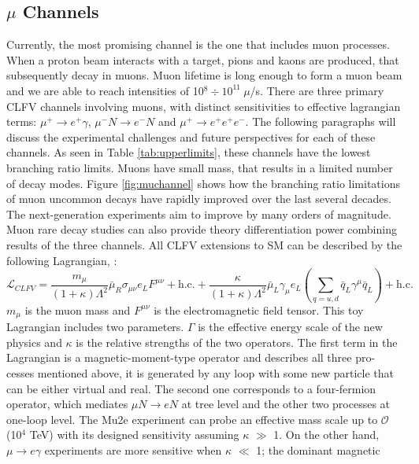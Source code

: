 \subsection{$\mu$ Channels}
Currently, the most promising channel is the one that includes muon processes. When a proton beam interacts with a target, pions and kaons are produced, that subsequently decay in muons. Muon lifetime is long enough to form a muon beam and we are able to reach intensities of 10$^8 \div 10^{11} \  \mu$/s. There are three primary CLFV channels involving muons, with distinct sensitivities to effective lagrangian terms: $\mu^+ \rightarrow e^+ \gamma$, $\mu^- N \rightarrow e^- N$ and $\mu^+ \rightarrow e^+ e^+ e^-$. The following paragraphs will discuss the experimental challenges and future perspectives for each of these channels. As seen in Table \ref{tab:upperlimits}, these channels have the lowest branching ratio limits. Muons have small mass, that results in a limited number of decay modes. Figure \ref{fig:muchannel} shows how the branching ratio limitations of muon uncommon decays have rapidly improved over the last several decades. The next-generation experiments aim to improve by many orders of magnitude. Muon rare decay studies can also provide theory differentiation power combining results of the three channels. All CLFV extensions to SM can be described by the following Lagrangian, \cite{doi:10.1146/annurev-nucl-100809-131949}:
\begin{equation}\label{LCF}
\mathscr{L}_{C L F V}=\frac{m_\mu}{(1+\kappa) \Lambda^2} \bar{\mu}_R \sigma_{\mu \nu} e_L F^{\mu \nu}+\text{h.c.}+\frac{\kappa}{(1+\kappa) \Lambda^2} \bar{\mu}_L \gamma_\mu e_L\left(\sum_{q=u, d} \bar{q}_L \gamma^\mu \bar{q}_L\right)+\text{h.c.}
\end{equation}
$m_\mu$ is the muon mass and  $F^{\mu \nu}$ is the electromagnetic field tensor. This toy Lagrangian includes two parameters.
$\Gamma$ is the effective energy scale of the new physics and $\kappa$
is the relative strengths of the two operators. The first term in the Lagrangian is a magnetic-moment-type operator and describes all three pro-
cesses mentioned above, it is generated by any loop with some new particle that can be either virtual and real.
The second one corresponds to a four-fermion operator, which mediates $\mu N \rightarrow eN$ at tree level and the other two processes at one-loop level.
The Mu2e experiment can probe an effective mass scale up to $\mathcal{O}$(10$^4$ TeV) with its designed sensitivity assuming $\kappa$ $\gg$ 1.
On the other hand, $\mu \rightarrow e\gamma$ experiments are more sensitive when $\kappa$ $\ll$ 1; the dominant magnetic
